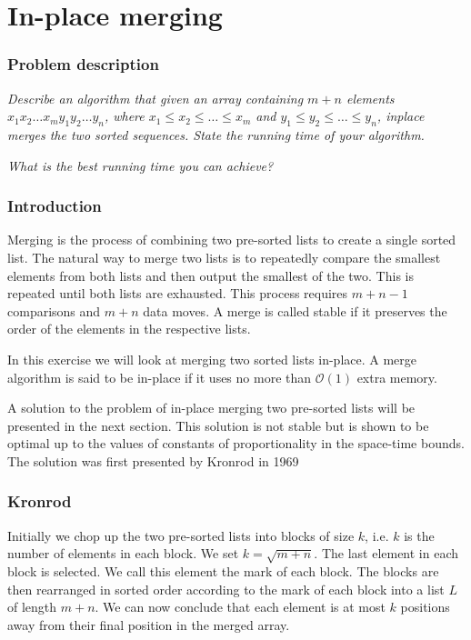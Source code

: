 \documentclass[a4paper,oneside,article,11pt]{memoir}
\begin{document}
\chapter{In-place merging}
\label{chp:inplace}
\subsection{Problem description}
\textit{Describe an algorithm that given an array containing $m+n$ elements $x_1x_2\dots x_m y_1y_2\dots y_n$, where $x_1\leq x_2\leq \dots \leq x_m$ and $y_1\leq y_2\leq \dots \leq y_n$, inplace merges the two sorted sequences. State the running time of your algorithm.}

\textit{What is the best running time you can achieve?}

\subsection{Introduction}
Merging is the process of combining two pre-sorted lists to create a single sorted list. The natural way to merge two lists is to repeatedly compare the smallest elements from both lists and then output the smallest of the two. This is repeated until both lists are exhausted. This process requires $m+n-1$ comparisons and $m+n$ data moves. A merge is called stable if it preserves the order of the elements in the respective lists.

In this exercise we will look at merging two sorted lists in-place. A merge algorithm is said to be in-place if it uses no more than $\mathcal{O}(1)$ extra memory.

A solution to the problem of in-place merging two pre-sorted lists will be presented in the next section. This solution is not stable but is shown to be optimal up to the values of constants of proportionality in the space-time bounds. The solution was first presented by Kronrod in 1969 \cite{Kronrod}

\subsection{Kronrod}
Initially we chop up the two pre-sorted lists into blocks of size $k$, i.e. $k$ is the number of elements in each block. We set $k =\sqrt{m+n}$. The last element in each block is selected. We call this element the mark of each block. The blocks are then rearranged in sorted order according to the mark of each block into a list $L$ of length $m+n$. We can now conclude that each element is at most $k$ positions away from their final position in the merged array.
\end{document}
